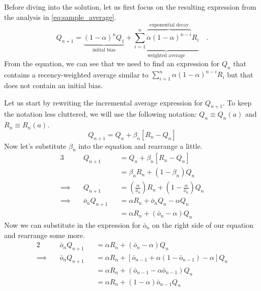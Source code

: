 \documentclass[12pt]{article}
\begin{document}
\noindent
Before diving into the solution, let us first focus on the resulting expression from the analysis in \eqref{eq:sample_average}.
\begin{equation}
    \tag{2.6}
    \label{eq:sample_average}
    Q_{n + 1} = \underbrace{\left(1 - \alpha\right)^nQ_1}_\text{initial bias} + \underbrace{\sum^n_{i = 1} \overbrace{\alpha\left(1 - \alpha\right)^{n - i}}^\text{exponential decay}R_i}_\text{weighted average}
    \quad\text{.}
\end{equation}
From the equation, we can see that we need to find an expression for $Q_n$ that contains a recency-weighted average similar to $\sum^n_{i = 1}\alpha\left(1 - \alpha\right)^{n - i}R_i$ but that does not contain an initial bias.
\par\bigskip

\noindent
Let us start by rewriting the incremental average expression for $Q_{n + 1}$.
To keep the notation less cluttered, we will use the following notation: $Q_n \equiv Q_n(a)$ and $R_n \equiv R_n(a)$.
\begin{equation*}
    Q_{n + 1} = Q_n + \beta_n\left[R_n - Q_n\right]
\end{equation*}
Now let's substitute $\beta_n$ into the equation and rearrange a little.
\begin{alignat*}{3}
    & Q_{n + 1} && = Q_n + \beta_n\left[R_n - Q_n\right] \\
    & && = \beta_n R_n + \left(1 - \beta_n\right) Q_n \\
    \implies\quad & Q_{n + 1} && = \left(\frac{\alpha}{\bar{o}_n}\right) R_n + \left(1 - \frac{\alpha}{\bar{o}_n}\right) Q_n \\
    \implies\quad & \bar{o}_n Q_{n + 1} && = \alpha R_n + \bar{o}_n Q_n - \alpha Q_n \\
    & && = \alpha R_n + \left(\bar{o}_n - \alpha\right) Q_n
\end{alignat*}
Now we can substitute in the expression for $\bar{o}_n$ on the right side of our equation and rearrange some more.
\begin{alignat*}{2}
    & \bar{o}_n Q_{n + 1} && = \alpha R_n + \left(\bar{o}_n - \alpha\right) Q_n \\
    \implies\quad & \bar{o}_n Q_{n + 1} && = \alpha R_n + \left[\bar{o}_{n-1} + \alpha \left(1 - \bar{o}_{n - 1}\right) - \alpha\right] Q_n \\
    & && = \alpha R_n + \left(\bar{o}_{n-1} - \alpha \bar{o}_{n - 1}\right) Q_n \\
    & && = \alpha R_n + \left(1 - \alpha \right) \bar{o}_{n - 1} Q_n
\end{alignat*}
\end{document}
